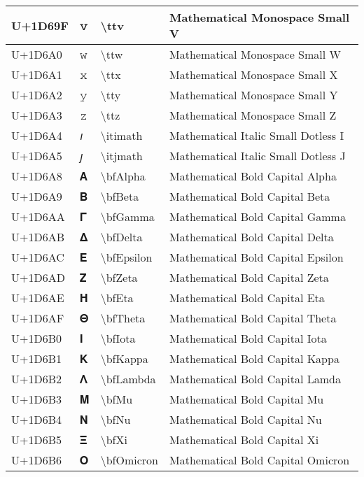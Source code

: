 \begin{table}[h]
\begin{tabulary}{\linewidth}{|L|L|L|L|}
\hline
U+1D69F & 𝚟 & {\textbackslash}ttv & Mathematical Monospace Small V \\
\hline
U+1D6A0 & 𝚠 & {\textbackslash}ttw & Mathematical Monospace Small W \\
\hline
U+1D6A1 & 𝚡 & {\textbackslash}ttx & Mathematical Monospace Small X \\
\hline
U+1D6A2 & 𝚢 & {\textbackslash}tty & Mathematical Monospace Small Y \\
\hline
U+1D6A3 & 𝚣 & {\textbackslash}ttz & Mathematical Monospace Small Z \\
\hline
U+1D6A4 & 𝚤 & {\textbackslash}itimath & Mathematical Italic Small Dotless I \\
\hline
U+1D6A5 & 𝚥 & {\textbackslash}itjmath & Mathematical Italic Small Dotless J \\
\hline
U+1D6A8 & 𝚨 & {\textbackslash}bfAlpha & Mathematical Bold Capital Alpha \\
\hline
U+1D6A9 & 𝚩 & {\textbackslash}bfBeta & Mathematical Bold Capital Beta \\
\hline
U+1D6AA & 𝚪 & {\textbackslash}bfGamma & Mathematical Bold Capital Gamma \\
\hline
U+1D6AB & 𝚫 & {\textbackslash}bfDelta & Mathematical Bold Capital Delta \\
\hline
U+1D6AC & 𝚬 & {\textbackslash}bfEpsilon & Mathematical Bold Capital Epsilon \\
\hline
U+1D6AD & 𝚭 & {\textbackslash}bfZeta & Mathematical Bold Capital Zeta \\
\hline
U+1D6AE & 𝚮 & {\textbackslash}bfEta & Mathematical Bold Capital Eta \\
\hline
U+1D6AF & 𝚯 & {\textbackslash}bfTheta & Mathematical Bold Capital Theta \\
\hline
U+1D6B0 & 𝚰 & {\textbackslash}bfIota & Mathematical Bold Capital Iota \\
\hline
U+1D6B1 & 𝚱 & {\textbackslash}bfKappa & Mathematical Bold Capital Kappa \\
\hline
U+1D6B2 & 𝚲 & {\textbackslash}bfLambda & Mathematical Bold Capital Lamda \\
\hline
U+1D6B3 & 𝚳 & {\textbackslash}bfMu & Mathematical Bold Capital Mu \\
\hline
U+1D6B4 & 𝚴 & {\textbackslash}bfNu & Mathematical Bold Capital Nu \\
\hline
U+1D6B5 & 𝚵 & {\textbackslash}bfXi & Mathematical Bold Capital Xi \\
\hline
U+1D6B6 & 𝚶 & {\textbackslash}bfOmicron & Mathematical Bold Capital Omicron \\

\end{tabulary}
\end{table}
